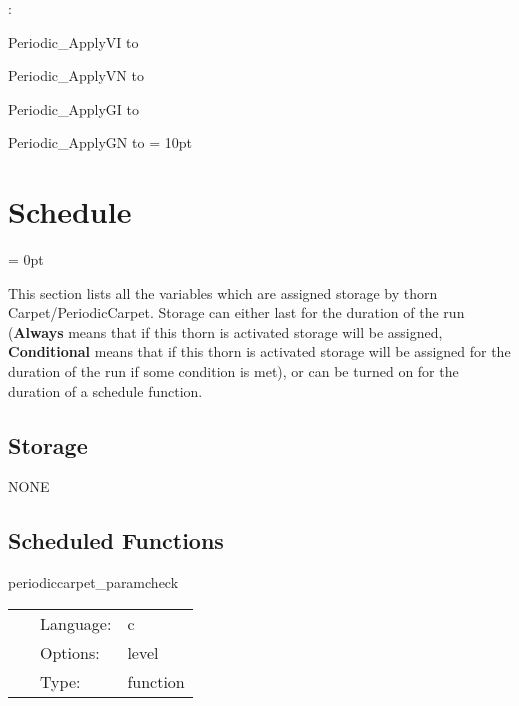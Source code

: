 : 



Periodic\_ApplyVI to 

Periodic\_ApplyVN to 

Periodic\_ApplyGI to 

Periodic\_ApplyGN to 
\vspace{2mm}\parskip = 10pt 

\section{Schedule} 


\parskip = 0pt


\noindent This section lists all the variables which are assigned storage by thorn Carpet/PeriodicCarpet.  Storage can either last for the duration of the run ({\bf Always} means that if this thorn is activated storage will be assigned, {\bf Conditional} means that if this thorn is activated storage will be assigned for the duration of the run if some condition is met), or can be turned on for the duration of a schedule function.


\subsection*{Storage}NONE
\subsection*{Scheduled Functions}
\vspace{5mm}


\hspace{5mm} periodiccarpet\_paramcheck 

\hspace{5mm}{\it register periodic boundary conditions } 


\hspace{5mm}

 \begin{tabular*}{160mm}{cll} 
~ & Language:  & c \\ 
~ & Options:  & level \\ 
~ & Type:  & function \\ 
\end{tabular*} 


\vspace{5mm}


